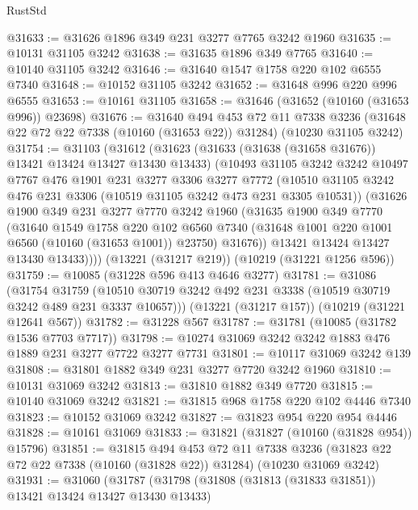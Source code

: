 \begin{lexlean}{RustStd}
\begin{coremodule}
@31633 := @31626 @1896 @349 @231 @3277 @7765 @3242 @1960
@31635 := @10131 @31105 @3242
@31638 := @31635 @1896 @349 @7765
@31640 := @10140 @31105 @3242
@31646 := @31640 @1547 @1758 @220 @102 @6555 @7340
@31648 := @10152 @31105 @3242
@31652 := @31648 @996 @220 @996 @6555
@31653 := @10161 @31105
@31658 := @31646 (@31652 (@10160 (@31653 @996)) @23698)
@31676 := @31640
    @494
    @453
    @72
    @11
    @7338
    @3236
    (@31648 @22 @72 @22 @7338 (@10160 (@31653 @22)) @31284)
    (@10230 @31105 @3242)
@31754 := @31103
    (@31612
      (@31623
        (@31633 (@31638 (@31658 @31676)) @13421 @13424 @13427 @13430 @13433)
        (@10493
          @31105
          @3242
          @3242
          @10497
          @7767
          @476
          @1901
          @231
          @3277
          @3306
          @3277
          @7772
          (@10510 @31105 @3242 @476 @231 @3306 (@10519 @31105 @3242 @473 @231 @3305 @10531))
          (@31626
            @1900
            @349
            @231
            @3277
            @7770
            @3242
            @1960
            (@31635
              @1900
              @349
              @7770
              (@31640
                @1549
                @1758
                @220
                @102
                @6560
                @7340
                (@31648 @1001 @220 @1001 @6560 (@10160 (@31653 @1001)) @23750)
                @31676))
            @13421
            @13424
            @13427
            @13430
            @13433))))
    (@13221 (@31217 @219))
    (@10219 (@31221 @1256 @596))
@31759 := @10085 (@31228 @596 @413 @4646 @3277)
@31781 := @31086
    (@31754
      @31759
      (@10510 @30719 @3242 @492 @231 @3338 (@10519 @30719 @3242 @489 @231 @3337 @10657)))
    (@13221 (@31217 @157))
    (@10219 (@31221 @12641 @567))
@31782 := @31228 @567
@31787 := @31781 (@10085 (@31782 @1536 @7703 @7717))
@31798 := @10274 @31069 @3242 @3242 @1883 @476 @1889 @231 @3277 @7722 @3277 @7731
@31801 := @10117 @31069 @3242 @139
@31808 := @31801 @1882 @349 @231 @3277 @7720 @3242 @1960
@31810 := @10131 @31069 @3242
@31813 := @31810 @1882 @349 @7720
@31815 := @10140 @31069 @3242
@31821 := @31815 @968 @1758 @220 @102 @4446 @7340
@31823 := @10152 @31069 @3242
@31827 := @31823 @954 @220 @954 @4446
@31828 := @10161 @31069
@31833 := @31821 (@31827 (@10160 (@31828 @954)) @15796)
@31851 := @31815
    @494
    @453
    @72
    @11
    @7338
    @3236
    (@31823 @22 @72 @22 @7338 (@10160 (@31828 @22)) @31284)
    (@10230 @31069 @3242)
@31931 := @31060
    (@31787
      (@31798
        (@31808 (@31813 (@31833 @31851)) @13421 @13424 @13427 @13430 @13433)

\end{coremodule}
\end{lexlean}
